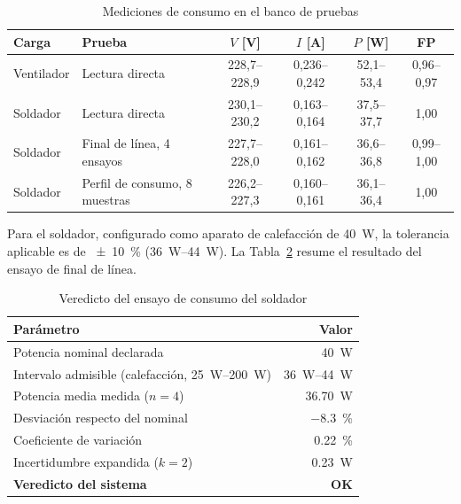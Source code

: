 \begin{table}[htbp]
\centering
\caption{Mediciones de consumo en el banco de pruebas}
\label{tab:resultados_consumo}
\renewcommand{\arraystretch}{1.25}
\small\setlength{\tabcolsep}{4pt}
\begin{tabular}{@{} l p{3.6cm} c c c c @{}}
\toprule
\textbf{Carga} & \textbf{Prueba} & \textbf{$V$ [\si{\volt}]} &
\textbf{$I$ [\si{\ampere}]} & \textbf{$P$ [\si{\watt}]} & \textbf{FP} \\
\midrule
Ventilador & Lectura directa
  & 228,7--228,9 & 0,236--0,242 & 52,1--53,4 & 0,96--0,97 \\
Soldador   & Lectura directa
  & 230,1--230,2 & 0,163--0,164 & 37,5--37,7 & 1,00 \\
Soldador   & Final de línea, 4 ensayos
  & 227,7--228,0 & 0,161--0,162 & 36,6--36,8 & 0,99--1,00 \\
Soldador   & Perfil de consumo, 8 muestras
  & 226,2--227,3 & 0,160--0,161 & 36,1--36,4 & 1,00 \\
\bottomrule
\end{tabular}
\end{table}

Para el soldador, configurado como aparato de calefacción de \SI{40}{\watt}, la
tolerancia aplicable es de \SI{\pm 10}{\percent} (\SIrange{36}{44}{\watt}). La
Tabla~\ref{tab:resultados_veredicto} resume el resultado del ensayo de final de
línea.

\begin{table}[htbp]
\centering
\caption{Veredicto del ensayo de consumo del soldador}
\label{tab:resultados_veredicto}
\renewcommand{\arraystretch}{1.25}
\begin{tabular}{@{} l r @{}}
\toprule
\textbf{Parámetro} & \textbf{Valor} \\
\midrule
Potencia nominal declarada        & \SI{40}{\watt} \\
Intervalo admisible (calefacción, \SIrange{25}{200}{\watt}) & \SIrange{36}{44}{\watt} \\
Potencia media medida ($n = 4$)   & \SI{36,70}{\watt} \\
Desviación respecto del nominal   & \SI{-8,3}{\percent} \\
Coeficiente de variación          & \SI{0,22}{\percent} \\
Incertidumbre expandida ($k = 2$) & \SI{0,23}{\watt} \\
\midrule
\textbf{Veredicto del sistema}    & \textbf{OK} \\
\bottomrule
\end{tabular}
\end{table}

